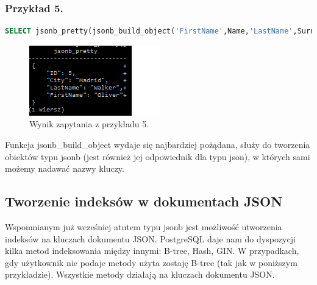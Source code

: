 \documentclass[a4paper,12pt,table]{article}
\begin{document}
{\subsubsection*{Przykład 5.}
\begin{lstlisting}[language=SQL,basicstyle=\footnotesize]
SELECT jsonb_pretty(jsonb_build_object('FirstName',Name,'LastName',Surname,'City',Town,'ID', idUsers)) FROM Users WHERE idUsers=5;
\end{lstlisting}
\vspace{0.5cm}
\begin{figure}[h]
\begin{center}
\includegraphics[scale=1]{sc/46}
\end{center}
\caption{Wynik zapytania z przykładu 5.}
\end{figure}%
Funkcja jsonb\_build\_object wydaje się najbardziej pożądana, służy do tworzenia obiektów typu jsonb (jest również jej odpowiednik dla typu json), w których sami możemy nadawać nazwy kluczy.


\newpage
\subsection{Tworzenie indeksów w dokumentach JSON}
Wspomnianym już wcześniej atutem typu jsonb jest możliwość utworzenia indeksów na kluczach dokumentu JSON. PostgreSQL daje nam do dyspozycji kilka metod indeksowania między innymi: B-tree, Hash, GIN. W przypadkach, gdy użytkownik nie podaje metody użyta zostaję B-tree (tak jak w poniższym przykładzie). Wszystkie metody działają na kluczach dokumentu JSON.
}
\end{document}
